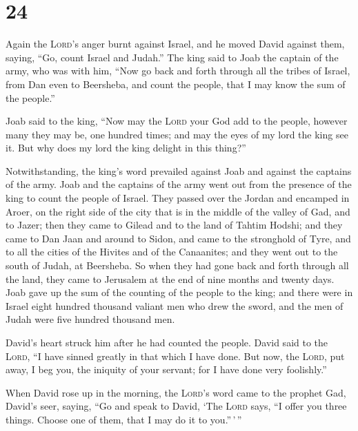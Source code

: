 \hypertarget{section-23}{%
\section{24}\label{section-23}}

 Again the \textsc{Lord}'s anger burnt against Israel, and
he moved David against them, saying, ``Go, count Israel and Judah.''
 The king said to Joab the captain of the army, who was
with him, ``Now go back and forth through all the tribes of Israel, from
Dan even to Beersheba, and count the people, that I may know the sum of
the people.''

 Joab said to the king, ``Now may the \textsc{Lord} your
God add to the people, however many they may be, one hundred times; and
may the eyes of my lord the king see it. But why does my lord the king
delight in this thing?''

 Notwithstanding, the king's word prevailed against Joab
and against the captains of the army. Joab and the captains of the army
went out from the presence of the king to count the people of Israel.
 They passed over the Jordan and encamped in Aroer, on the
right side of the city that is in the middle of the valley of Gad, and
to Jazer;  then they came to Gilead and to the land of
Tahtim Hodshi; and they came to Dan Jaan and around to Sidon,
 and came to the stronghold of Tyre, and to all the cities
of the Hivites and of the Canaanites; and they went out to the south of
Judah, at Beersheba.  So when they had gone back and forth
through all the land, they came to Jerusalem at the end of nine months
and twenty days.  Joab gave up the sum of the counting of
the people to the king; and there were in Israel eight hundred thousand
valiant men who drew the sword, and the men of Judah were five hundred
thousand men.

 David's heart struck him after he had counted the
people. David said to the \textsc{Lord}, ``I have sinned greatly in that
which I have done. But now, the \textsc{Lord}, put away, I beg you, the
iniquity of your servant; for I have done very foolishly.''

 When David rose up in the morning, the \textsc{Lord}'s
word came to the prophet Gad, David's seer, saying,  ``Go
and speak to David, `The \textsc{Lord} says, ``I offer you three things.
Choose one of them, that I may do it to you.''\,'\,''

